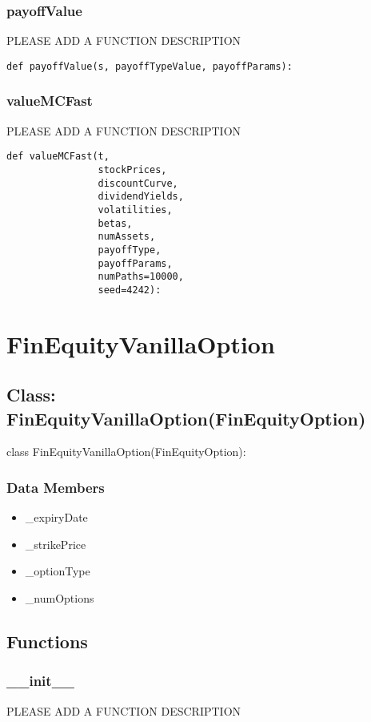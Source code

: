 \documentclass[twoside,11pt]{book}
\begin{document}
\subsubsection*{{\bf payoffValue}}
PLEASE ADD A FUNCTION DESCRIPTION

\begin{lstlisting}
def payoffValue(s, payoffTypeValue, payoffParams):
\end{lstlisting}

\subsubsection*{{\bf valueMCFast}}
PLEASE ADD A FUNCTION DESCRIPTION

\begin{lstlisting}
def valueMCFast(t,
                stockPrices,
                discountCurve,
                dividendYields,
                volatilities,
                betas,
                numAssets,
                payoffType,
                payoffParams,
                numPaths=10000,
                seed=4242):
\end{lstlisting}

\newpage
\section{FinEquityVanillaOption}

\subsection*{Class: FinEquityVanillaOption(FinEquityOption)}
class FinEquityVanillaOption(FinEquityOption): 

\subsubsection*{Data Members}
\begin{itemize}
\item{\_expiryDate}
\item{\_strikePrice}
\item{\_optionType}
\item{\_numOptions}
\end{itemize}

\subsection*{Functions}

\subsubsection*{{\bf \_\_init\_\_}}
PLEASE ADD A FUNCTION DESCRIPTION
\end{document}
